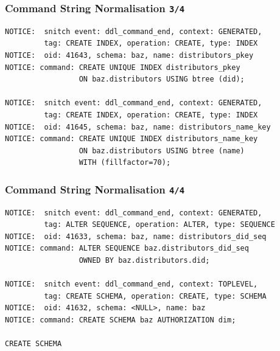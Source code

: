 \documentclass{beamer}
\begin{document}
\begin{frame}[fragile]
  \frametitle{Command String Normalisation \texttt{3/4}}

\begin{verbatim}
NOTICE:  snitch event: ddl_command_end, context: GENERATED,
         tag: CREATE INDEX, operation: CREATE, type: INDEX
NOTICE:  oid: 41643, schema: baz, name: distributors_pkey
NOTICE: command: CREATE UNIQUE INDEX distributors_pkey
                 ON baz.distributors USING btree (did);

NOTICE:  snitch event: ddl_command_end, context: GENERATED,
         tag: CREATE INDEX, operation: CREATE, type: INDEX
NOTICE:  oid: 41645, schema: baz, name: distributors_name_key
NOTICE: command: CREATE UNIQUE INDEX distributors_name_key
                 ON baz.distributors USING btree (name)
                 WITH (fillfactor=70);
\end{verbatim}
\end{frame}

\begin{frame}[fragile]
  \frametitle{Command String Normalisation \texttt{4/4}}

\begin{verbatim}
NOTICE:  snitch event: ddl_command_end, context: GENERATED,
         tag: ALTER SEQUENCE, operation: ALTER, type: SEQUENCE
NOTICE:  oid: 41633, schema: baz, name: distributors_did_seq
NOTICE: command: ALTER SEQUENCE baz.distributors_did_seq
                 OWNED BY baz.distributors.did;

NOTICE:  snitch event: ddl_command_end, context: TOPLEVEL,
         tag: CREATE SCHEMA, operation: CREATE, type: SCHEMA
NOTICE:  oid: 41632, schema: <NULL>, name: baz
NOTICE: command: CREATE SCHEMA baz AUTHORIZATION dim;

CREATE SCHEMA
\end{verbatim}
\end{frame}

\end{document}
